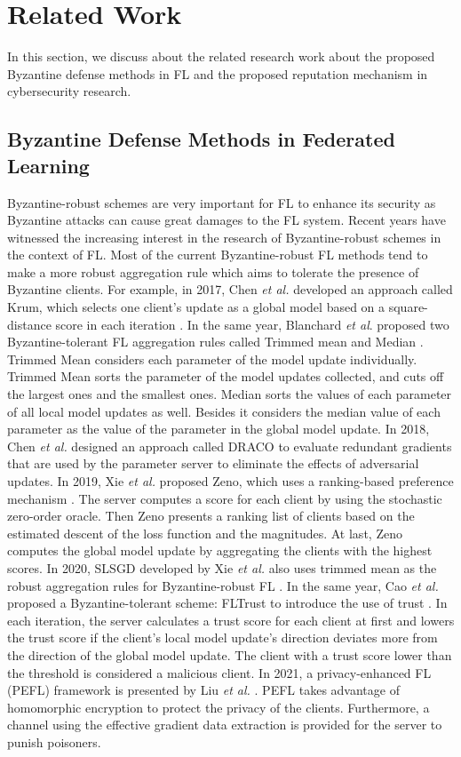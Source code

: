 \documentclass[journal]{IEEEtran}
\begin{document}
\section{Related Work}
In this section, we discuss about the related research work about the proposed Byzantine defense methods in FL and the proposed reputation mechanism in cybersecurity research.
\subsection{Byzantine Defense Methods in Federated Learning}
Byzantine-robust schemes are very important for FL to enhance its security as Byzantine attacks can cause great damages to the FL system. Recent years have witnessed the increasing interest in the research of Byzantine-robust schemes in the context of FL. Most of the current Byzantine-robust FL methods tend to make a more robust aggregation rule which aims to tolerate the presence of Byzantine clients. 
For example, in 2017, Chen \textit{et al.} developed an approach called Krum, which selects one client's update as a global model based on a square-distance score in each iteration \cite{ref_12_defense}.
In the same year, Blanchard \textit{et al}. proposed two Byzantine-tolerant FL aggregation rules called Trimmed mean and Median \cite{ref_16_defense}. Trimmed Mean considers each parameter of the model update individually. Trimmed Mean sorts the parameter of the model updates collected, and cuts off the largest ones and the smallest ones. Median sorts the values of each parameter of all local model updates as well. Besides it considers the median value of each parameter as the value of the parameter in the global model update. 
In 2018, Chen \textit{et al.} designed an approach called DRACO to evaluate redundant gradients that are used by the parameter server to eliminate the effects of adversarial updates. 
In 2019, Xie \textit{et al.} proposed Zeno, which uses a ranking-based preference mechanism \cite{ref_15_defense}. The server computes a score for each client by using the stochastic zero-order oracle. Then Zeno presents a ranking list of clients based on the estimated descent of the loss function and the magnitudes. At last, Zeno computes the global model update by aggregating the clients with the highest scores. 
In 2020, SLSGD developed by Xie \textit{et al.} also uses trimmed mean as the robust aggregation rules for Byzantine-robust FL \cite{ref_14_defense}. 
In the same year, Cao \textit{et al.} proposed a Byzantine-tolerant scheme: FLTrust to introduce the use of trust \cite{ref_17_defense}. In each iteration, the server calculates a trust score for each client at first and lowers the trust score if the client's local model update's direction deviates more from the direction of the global model update. The client with a trust score lower than the threshold is considered a malicious client.
In 2021, a privacy-enhanced FL (PEFL) framework is presented by Liu \textit{et al.}  \cite{ref_45_defense}. PEFL takes advantage of homomorphic encryption to protect the privacy of the clients. Furthermore, a channel using the effective gradient data extraction is provided for the server to punish poisoners.
\end{document}
